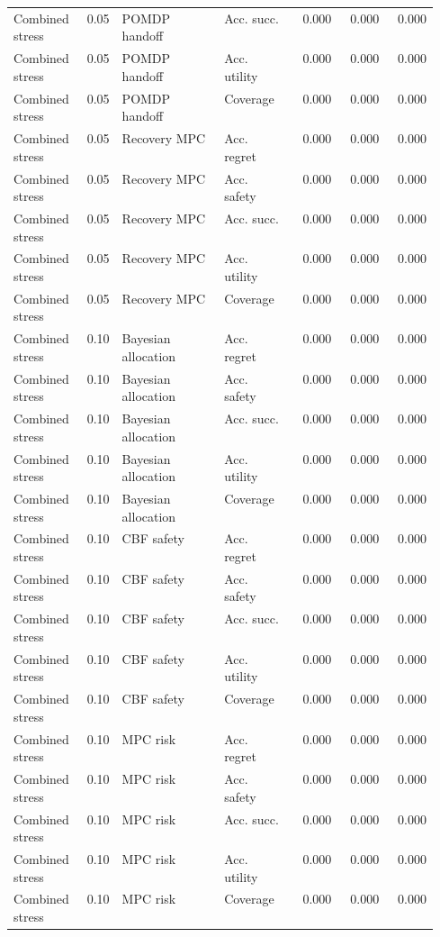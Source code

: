 \documentclass{article}
\begin{document}
\begin{center}
\begin{longtable}{p{0.14\linewidth}rp{0.24\linewidth}p{0.17\linewidth}rrr}
Combined stress & 0.05 & POMDP handoff & Acc. succ. & 0.000 & 0.000 & 0.000\\
Combined stress & 0.05 & POMDP handoff & Acc. utility & 0.000 & 0.000 & 0.000\\
Combined stress & 0.05 & POMDP handoff & Coverage & 0.000 & 0.000 & 0.000\\
Combined stress & 0.05 & Recovery MPC & Acc. regret & 0.000 & 0.000 & 0.000\\
Combined stress & 0.05 & Recovery MPC & Acc. safety & 0.000 & 0.000 & 0.000\\
Combined stress & 0.05 & Recovery MPC & Acc. succ. & 0.000 & 0.000 & 0.000\\
Combined stress & 0.05 & Recovery MPC & Acc. utility & 0.000 & 0.000 & 0.000\\
Combined stress & 0.05 & Recovery MPC & Coverage & 0.000 & 0.000 & 0.000\\
Combined stress & 0.10 & Bayesian allocation & Acc. regret & 0.000 & 0.000 & 0.000\\
Combined stress & 0.10 & Bayesian allocation & Acc. safety & 0.000 & 0.000 & 0.000\\
Combined stress & 0.10 & Bayesian allocation & Acc. succ. & 0.000 & 0.000 & 0.000\\
Combined stress & 0.10 & Bayesian allocation & Acc. utility & 0.000 & 0.000 & 0.000\\
Combined stress & 0.10 & Bayesian allocation & Coverage & 0.000 & 0.000 & 0.000\\
Combined stress & 0.10 & CBF safety & Acc. regret & 0.000 & 0.000 & 0.000\\
Combined stress & 0.10 & CBF safety & Acc. safety & 0.000 & 0.000 & 0.000\\
Combined stress & 0.10 & CBF safety & Acc. succ. & 0.000 & 0.000 & 0.000\\
Combined stress & 0.10 & CBF safety & Acc. utility & 0.000 & 0.000 & 0.000\\
Combined stress & 0.10 & CBF safety & Coverage & 0.000 & 0.000 & 0.000\\
Combined stress & 0.10 & MPC risk & Acc. regret & 0.000 & 0.000 & 0.000\\
Combined stress & 0.10 & MPC risk & Acc. safety & 0.000 & 0.000 & 0.000\\
Combined stress & 0.10 & MPC risk & Acc. succ. & 0.000 & 0.000 & 0.000\\
Combined stress & 0.10 & MPC risk & Acc. utility & 0.000 & 0.000 & 0.000\\
Combined stress & 0.10 & MPC risk & Coverage & 0.000 & 0.000 & 0.000\\

\end{longtable}
\end{center}
\end{document}
